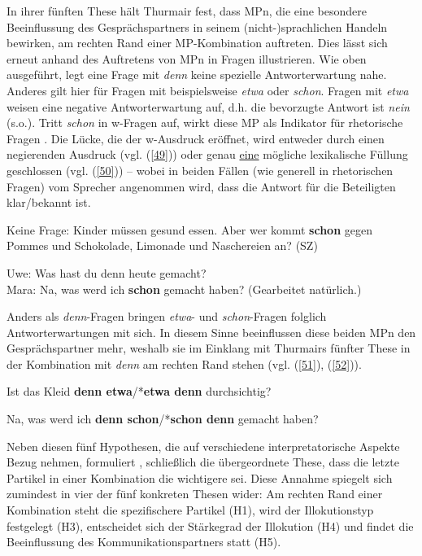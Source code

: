 In ihrer fünften These hält Thurmair fest, dass MPn, die eine besondere Be\-einflussung des Gesprächspartners in seinem (nicht-)sprachlichen Handeln bewirken, am rechten Rand einer MP-Kombination auftreten. Dies lässt sich erneut anhand des Auftretens von MPn in Fragen illustrieren. Wie oben ausgeführt, legt eine Frage  mit \textit{denn} keine spezielle Antworterwartung nahe. Anderes gilt hier für Fragen mit beispielsweise \textit{etwa} oder \textit{schon}. Fragen mit \textit{etwa} weisen eine ne\-gative Antworterwartung auf, d.h. die bevorzugte Antwort ist \textit{nein} (s.o.). Tritt \textit{schon} in w-Fragen  auf, wirkt diese MP als Indikator für rhetorische Fragen . Die Lücke, die der w-Ausdruck eröffnet, wird entweder durch einen negierenden Ausdruck (vgl. (\ref{49})) oder genau \underline{eine} mögliche lexikalische Füllung geschlossen (vgl. (\ref{50})) – wobei in beiden Fällen (wie generell in rhetorischen Fragen) vom Sprecher angenommen wird, dass die Antwort für die Beteiligten klar/bekannt ist.

\begin{exe}
	\ex\label{49} 
	Keine Frage: Kinder müssen gesund essen. Aber wer kommt \textbf{schon} gegen Pommes
 	und Schokolade, Limonade und Naschereien an? (SZ)
\end{exe}
	
\begin{exe}
	\ex\label{50} 
		Uwe: Was hast du denn heute gemacht? \\
		Mara: Na, was werd ich \textbf{schon} gemacht haben? (Gearbeitet natürlich.)
			\newline
			\hbox{}\hfill\hbox{\citet[154]{Thurmair1989}}	
\end{exe}
Anders als \textit{denn}-Fragen bringen \textit{etwa}- und \textit{schon}-Fragen folglich Antworterwar\-tungen mit sich. In diesem Sinne beeinflussen diese beiden MPn den Gesprächs\-partner mehr, weshalb sie im Einklang mit Thurmairs fünfter These in der Kombination mit \textit{denn} am rechten Rand stehen (vgl. (\ref{51}), (\ref{52})).

\begin{exe}
	\ex\label{51} 
	Ist das Kleid \textbf{denn etwa}/*\textbf{etwa denn} durchsichtig?
\end{exe}
\vspace{-0.65cm}
\begin{exe}
	\ex\label{52} 
	Na, was werd ich \textbf{denn schon}/*\textbf{schon denn} gemacht haben?
\end{exe}	
Neben diesen fünf Hypothesen, die auf verschiedene interpretatorische Aspekte Bezug nehmen, formuliert \citet[289]{Thurmair1989}, \citealt[31]{Thurmair1991} schließlich die übergeordnete These, dass die letzte Partikel in einer Kombination die wichtigere sei. Diese Annahme spiegelt sich zumindest in vier der fünf konkreten Thesen wider: Am rechten Rand einer Kombination steht die spezifischere Partikel (H1), wird der Illokutionstyp festgelegt (H3), entscheidet sich der Stärkegrad der Illokution (H4) und findet die Beeinflussung des Kommunikationspartners statt (H5).

